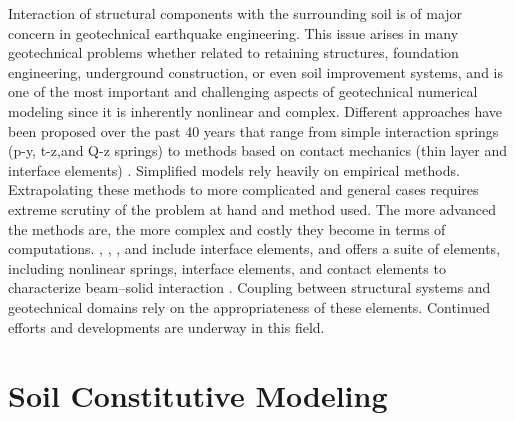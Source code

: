Interaction of structural components with the surrounding soil is of major concern in geotechnical earthquake engineering. This issue arises in many geotechnical problems whether related to retaining structures, foundation engineering, underground construction, or even soil improvement systems, and is one of the most important and challenging aspects of geotechnical numerical modeling since it is inherently nonlinear and complex. Diﬀerent approaches have been proposed over the past 40 years that range from simple interaction springs (p-y, t-z,and Q-z springs) \citep{API07} to methods based on contact mechanics (thin layer and interface elements) \citep[see][]{Laursen02}. Simpliﬁed models rely heavily on empirical methods. Extrapolating these methods to more complicated and general cases requires extreme scrutiny of the problem at hand and method used. The more advanced the methods are, the more complex and costly they become in terms of computations. \citealt{PLAXIS}, \citealt{FLAC}, \citealt{ABAQUS}, and \citealt{ESSI} include interface elements, and \citealt{OpenSees} offers a suite of elements, including nonlinear springs, interface elements, and contact elements to characterize beam–solid interaction \citep[see][]{Petek06, Ghofrani18}. Coupling between structural systems and geotechnical domains rely on the appropriateness of these elements. Continued efforts and developments are underway in this field. 

\section{Soil Constitutive Modeling}
\label{sec:resp_geotech_4}

